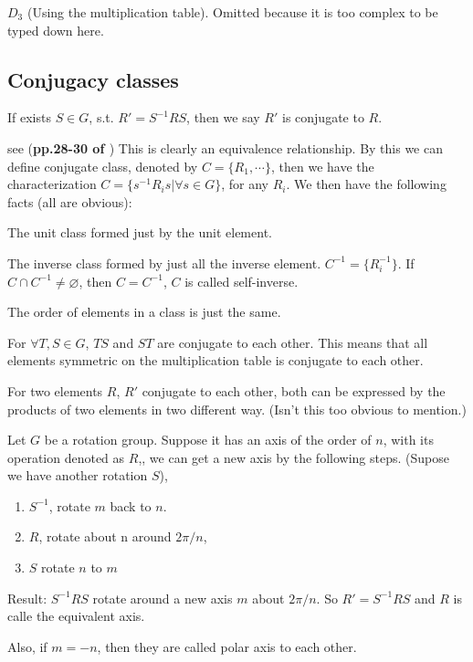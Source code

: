 \begin{ex}
    $D_3$ (Using the multiplication table). Omitted because it is too
    complex to be typed down here.
\end{ex}

\subsection{Conjugacy classes}
\label{sec:Conjugacy-classes}

\begin{defi}[Conjugate]
    If exists $S\in G$, s.t. $R' = S^{-1}RS$, then we say $R'$ is
    conjugate to $R$.
\end{defi}
see (\textbf{pp.28-30 of \cite{book}})
This is clearly an equivalence relationship. By this we can define
conjugate class, denoted by $C=\{R_1,\cdots\}$, then we have the
characterization $C = \{ s^{-1} R_i s|\forall s\in G\}$, for any
$R_i$. We then have the following facts (all are obvious):
\begin{fact}
The unit class formed just by the unit element.
\end{fact}
\begin{fact}
    The inverse class formed by just all the inverse element.  $C^{-1}
    = \{ R_i^{-1}\}$. If $C\cap C^{-1}\neq\varnothing$, then
    $C=C^{-1}$, $C$ is called self-inverse.
\end{fact}
\begin{fact}
    The order of elements in a class is just the same.
\end{fact}
\begin{fact}
    For $\forall T,S\in G$, $TS$ and $ST$ are conjugate to each other.
    This means that all elements symmetric on the multiplication table is
    conjugate to each other.
\end{fact}
\begin{fact}
    For two elements $R$, $R'$ conjugate to each other, both can be
    expressed by the products of two elements in two different way. (Isn't
    this too obvious to mention.)
\end{fact}
\begin{fact}
    \label{fact:20161010-srs}
    Let $G$ be a rotation group. Suppose it has an axis of the
    order of $n$, with its operation denoted as $R$,, we can get a
    new axis by the following steps. (Supose we have another
    rotation $S$),
    \begin{enumerate}
        \item  $S^{-1}$, rotate $m$ back to $n$.
        \item  $R$, rotate about n around $2\pi/n$,
        \item  $S$ rotate $n$ to $m$
    \end{enumerate}

    Result: $S^{-1}RS$ rotate around a new axis $m$ about
    $2\pi/n$. So $R'=S^{-1}RS$ and $R$ is calle the equivalent
    axis. 
    
    Also, if $m=-n$, then they are called polar axis to each
    other.
\end{fact}
